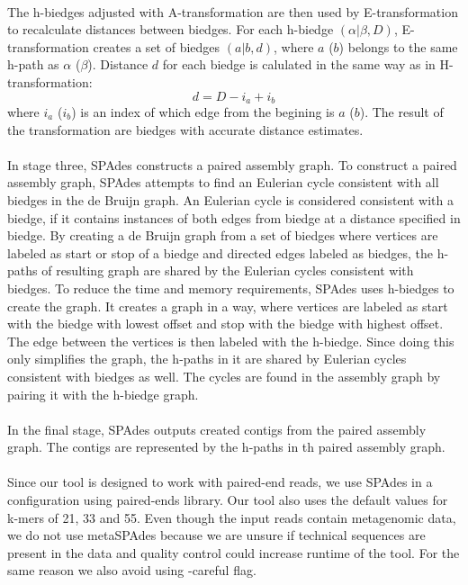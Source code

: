 \paragraph*{}
The h-biedges adjusted with A-transformation are then used by E-transformation to recalculate distances between biedges. For each h-biedge $(\alpha|\beta,D)$, E-transformation creates a set of biedges $(a|b,d)$, where $a$ ($b$) belongs to the same h-path as $\alpha$ ($\beta$). Distance $d$ for each biedge is calulated in the same way as in H-transformation:
\[ d = D - i_{a} + i_{b} \]
where $i_{a}$ ($i_{b}$) is an index of which edge from the begining is $a$ ($b$). The result of the transformation are biedges with accurate distance estimates.
\paragraph*{}
In stage three, SPAdes constructs a paired assembly graph. To construct a paired assembly graph, SPAdes attempts to find an Eulerian cycle consistent with all biedges in the de Bruijn graph. An Eulerian cycle is considered consistent with a biedge, if it contains instances of both edges from biedge at a distance specified in biedge. By creating a de Bruijn graph from a set of biedges where vertices are labeled as start or stop of a biedge and directed edges labeled as biedges, the h-paths of resulting graph are shared by the Eulerian cycles consistent with biedges. To reduce the time and memory requirements, SPAdes uses h-biedges to create the graph. It creates a graph in a way, where vertices are labeled as start with the biedge with lowest offset and stop with the biedge with highest offset. The edge between the vertices is then labeled with the h-biedge. Since doing this only simplifies the graph, the h-paths in it are shared by Eulerian cycles consistent with biedges as well. The cycles are found in the assembly graph by pairing it with the h-biedge graph.
\paragraph*{}
In the final stage, SPAdes outputs created contigs from the paired assembly graph. The contigs are represented by the h-paths in th paired assembly graph.
\paragraph*{}
Since our tool is designed to work with paired-end reads, we use SPAdes in a configuration using paired-ends library. Our tool also uses the default values for k-mers of 21, 33 and 55. Even though the input reads contain metagenomic data, we do not use metaSPAdes because we are unsure if technical sequences are present in the data and quality control could increase runtime of the tool. For the same reason we also avoid using -careful flag.

